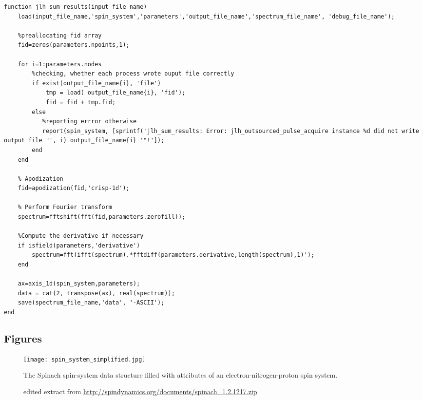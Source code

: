 \documentclass[11.5pt,a4paper]{article}
\begin{document}
\begin{lstlisting}
function jlh_sum_results(input_file_name)
    load(input_file_name,'spin_system','parameters','output_file_name','spectrum_file_name', 'debug_file_name');

    %preallocating fid array
    fid=zeros(parameters.npoints,1);
    
    for i=1:parameters.nodes
        %checking, whether each process wrote ouput file correctly
        if exist(output_file_name{i}, 'file')
            tmp = load( output_file_name{i}, 'fid');
            fid = fid + tmp.fid;
        else
           %reporting errror otherwise
           report(spin_system, [sprintf('jlh_sum_results: Error: jlh_outsourced_pulse_acquire instance %d did not write output file "', i) output_file_name{i} '"!']);
        end
    end   

    % Apodization
    fid=apodization(fid,'crisp-1d');

    % Perform Fourier transform
    spectrum=fftshift(fft(fid,parameters.zerofill));

    %Compute the derivative if necessary
    if isfield(parameters,'derivative')
        spectrum=fft(ifft(spectrum).*fftdiff(parameters.derivative,length(spectrum),1)');
    end

    ax=axis_1d(spin_system,parameters);
    data = cat(2, transpose(ax), real(spectrum));
    save(spectrum_file_name,'data', '-ASCII');
end
\end{lstlisting}


\subsection{Figures}

\begin{figure}
  \centering
 \texttt{[image: spin\_system\_simplified.jpg]}
  \caption{The Spinach spin-system data structure filled with attributes of an electron-nitrogen-proton spin system.}
  \caption*{edited extract from \url{http://spindynamics.org/documents/spinach_1.2.1217.zip}}
\end{figure}
\end{document}
